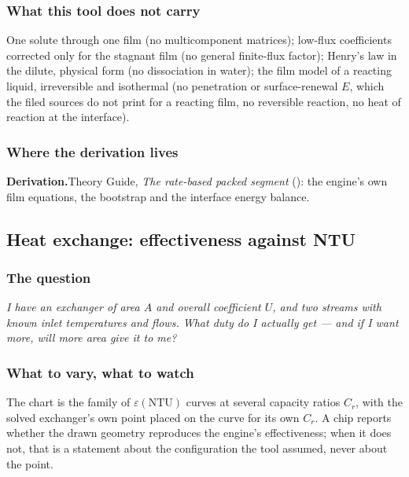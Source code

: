 \documentclass[11pt,a4paper]{article}
\newcommand{\derivation}[1]{%
  \smallskip\noindent\textbf{\sffamily\small Derivation.}\quad #1\par\smallskip}
\begin{document}
\subsubsection*{What this tool does not carry}

One solute through one film (no multicomponent matrices); low-flux coefficients
corrected only for the stagnant film (no general finite-flux factor); Henry's
law in the dilute, physical form (no dissociation in water); the film model of a
reacting liquid, irreversible and isothermal (no penetration or surface-renewal
$E$, which the filed sources do not print for a reacting film, no reversible
reaction, no heat of reaction at the interface).

\subsubsection*{Where the derivation lives}

\derivation{Theory Guide, \emph{The rate-based packed segment}
(\theorydest{sec:rateBasedSegment}): the engine's own film equations, the
bootstrap and the interface energy balance.}

\subsection{Heat exchange: effectiveness against NTU}\label{sec:edu-entu}


\subsubsection*{The question}

\emph{I have an exchanger of area $A$ and overall coefficient $U$, and two
streams with known inlet temperatures and flows.  What duty do I actually
get --- and if I want more, will more area give it to me?}

\subsubsection*{What to vary, what to watch}

The chart is the family of $\varepsilon(\mathrm{NTU})$ curves at several
capacity ratios $C_r$, with the solved exchanger's own point placed on the
curve for its own $C_r$.  A chip reports whether the drawn geometry
reproduces the engine's effectiveness; when it does not, that is a
statement about the configuration the tool assumed, never about the point.
\end{document}
